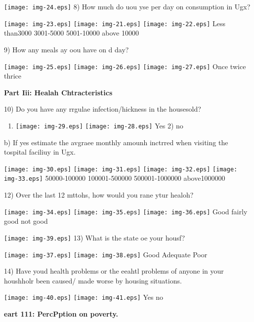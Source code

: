 \documentclass[12pt]{article}
\begin{document}
\texttt{[image: img-24.eps]}        8) How much do uou yse per day
on consumption in Ugx?

\texttt{[image: img-23.eps]}
\texttt{[image: img-21.eps]} \texttt{[image: img-22.eps]}
           Less than3000             3001-5000           5001-10000              
  above 10000

{\raggedright
9) How any meals ay oou have on d day?
}

\texttt{[image: img-25.eps]}
\texttt{[image: img-26.eps]} \texttt{[image: img-27.eps]}
          Once             twice          thrice

\textbf{Part Iii: Healah Chtracteristics }

10) Do you have any rrgulae infection/hickness in the housesold?

\begin{enumerate}
	\item \texttt{[image: img-29.eps]}
\texttt{[image: img-28.eps]} Yes           2) no
\end{enumerate}

b) If yes estimate the avgraee monthly amounh inctrred when visiting the
tospital faciliuy in Ugx.

\texttt{[image: img-30.eps]}
\texttt{[image: img-31.eps]} \texttt{[image: img-32.eps]}
\texttt{[image: img-33.eps]}  50000-100000         100001-500000     
  500001-1000000        above1000000

12) Over the last 12 mttohs, how would you rane ytur healoh?

\texttt{[image: img-34.eps]}
\texttt{[image: img-35.eps]} \texttt{[image: img-36.eps]}
     Good             fairly good                    not good

\texttt{[image: img-39.eps]} 13) What is the state oe your housf?

\texttt{[image: img-37.eps]}
\texttt{[image: img-38.eps]}           Good           Adequate       
        Poor

14) Have youd health problems or the eeahtl problems of anyone in your houshholr
been caused/ made worse by housing situations.

\texttt{[image: img-40.eps]}
\texttt{[image: img-41.eps]}          Yes              no

\textbf{eart 111: PercPption on poverty.     }
\end{document}
